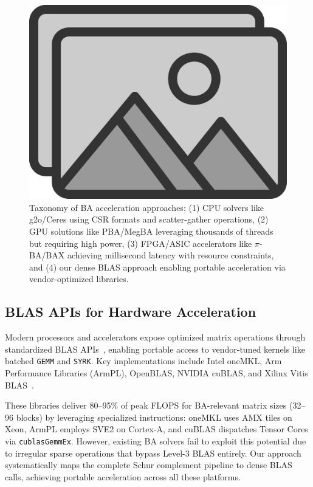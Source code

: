 \begin{figure}[t]
  \centering
  \includegraphics[width=0.85\linewidth]{figs/placeholder}
  \caption{Taxonomy of BA acceleration approaches: (1) CPU solvers like g2o/Ceres using CSR formats and scatter-gather operations, 
  (2) GPU solutions like PBA/MegBA leveraging thousands of threads but requiring high power, (3) FPGA/ASIC accelerators like 
  $\pi$-BA/BAX achieving millisecond latency with resource constraints, and (4) our dense BLAS approach enabling portable 
  acceleration via vendor-optimized libraries.}
  \label{fig:rw_taxonomy}
\end{figure}

\subsection{BLAS APIs for Hardware Acceleration}\label{subsec:blas_apis}

Modern processors and accelerators expose optimized matrix operations through standardized BLAS APIs~\cite{blackford2002updated}, 
enabling portable access to vendor-tuned kernels like batched \texttt{GEMM} and \texttt{SYRK}. Key implementations include 
Intel oneMKL, Arm Performance Libraries (ArmPL), OpenBLAS, NVIDIA cuBLAS, and Xilinx Vitis BLAS~\cite{intel2023mkl,arm2023armpl,openblas2023,nvidia2025cublas,xilinx2024vitisblas}.

These libraries deliver 80–95\% of peak FLOPS for BA-relevant matrix sizes (32–96 blocks) by leveraging specialized 
instructions: oneMKL uses AMX tiles on Xeon, ArmPL employs SVE2 on Cortex-A, and cuBLAS dispatches Tensor Cores via 
\texttt{cublasGemmEx}. However, existing BA solvers fail to exploit this potential due to irregular sparse operations that 
bypass Level-3 BLAS entirely. Our approach systematically maps the complete Schur complement pipeline to dense BLAS calls, 
achieving portable acceleration across all these platforms.


